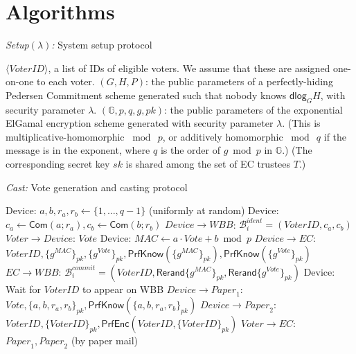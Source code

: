 \documentclass[12pt,a4paper]{article}
\newcommand{\commit}{\mathsf{Com}}
\newcommand{\PrfEnc}{\mathsf{PrfEnc}}
\newcommand{\PrfKnow}{\mathsf{PrfKnow}}
\newcommand{\rerand}{\mathsf{Rerand}}
\newcommand{\dlog}{\mathsf{dlog}}
\theoremstyle{definition}
\newcommand{\Vote}{\mathit{Vote}}
\newcommand{\VoterID}{\mathit{VoterID}}
\newcommand{\Paper}{\mathit{Paper}}
\newcommand{\Mac}{\mathit{MAC}}
\newcommand{\Wbb}{\mathit{WBB}}
\begin{document}
\section{Algorithms}\label{app-algorithms}
\singlespacing
\begin{algorithm} 	\caption{\textit{Setup}$(\lambda)$\textit{:} System setup protocol}
	\begin{algorithmic}[1]
\State $\langle \VoterID \rangle$, a list of IDs of eligible voters.  We assume that these are assigned one-on-one to each voter.
\State	$(G,H,P)$: the public parameters of a perfectly-hiding Pedersen Commitment scheme  generated such that nobody knows $\dlog_G H$, with security parameter $\lambda$.
\State $(\mathbb{G}, p, q, g, pk)$: the public parameters of the exponential ElGamal encryption scheme generated with security parameter $\lambda$.
(This is multiplicative-homomorphic $\bmod\ p$, or additively homomorphic $\bmod\ q$ if the message is in the exponent, where $q$ is the order of $g\bmod p$ in $\mathbb{G}$.)
\State  (The corresponding secret key  $sk$ is shared among the set of EC trustees $T$.)
\end{algorithmic}
	\label{fig:setup}
\end{algorithm}
\begin{algorithm} 	\caption{\textit{Cast:} Vote generation and casting protocol}
	\begin{algorithmic}[1]
	\State Device: $a,b,r_a,r_b\leftarrow\{1,\ldots,q-1\}$ (uniformly at random)
	\State Device: $c_a\leftarrow\commit(a;r_a), c_b\leftarrow\commit(b;r_b)$
	\State $Device\rightarrow \Wbb$: $\mathcal{B}^{ident}_i=(\VoterID, c_a, c_b)$
	\State $Voter\rightarrow Device$: $\Vote$
	\State Device: $\Mac\leftarrow a\cdot Vote+b\bmod p$
	\State $Device\rightarrow EC$: $\VoterID, \{g^\Mac\}_{pk}, \{g^\Vote\}_{pk}, \PrfKnow(\{g^\Mac\}_{pk}), \PrfKnow(\{g^\Vote\}_{pk})$%
	\State $EC\rightarrow \Wbb$: $\mathcal{B}^{commit}_i=(\VoterID, \rerand\{g^\Mac\}_{pk}, \rerand\{g^\Vote\}_{pk})$ \label{Step:ECPostsVoteMAC}
	\State Device: Wait for $\VoterID$ to appear on WBB
	\State $Device\rightarrow \Paper_1$: $\Vote, \{a,b,r_a,r_b\}_{pk}, \PrfKnow(\{a,b,r_a,r_b\}_{pk})$
	\State $Device\rightarrow \Paper_2$: $\VoterID, \{\VoterID\}_{pk}, \PrfEnc(\VoterID, \{\VoterID\}_{pk})$
	\State $Voter\rightarrow EC$: $\Paper_1, \Paper_2$ (by paper mail)
	\end{algorithmic}
\label{fig:genAndCasting}
\end{algorithm}
\end{document}
